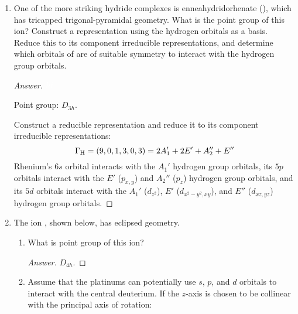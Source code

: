 \documentclass[../psets.tex]{subfiles}
\begin{document}
\begin{enumerate}[label={\Roman*)}]
\begin{enumerate}[label={\textbf{10.\arabic*}}]
\begin{proof}[Answer]
        \end{proof}
        \newpage
        \setcounter{enumii}{29}
        \item One of the more striking hydride complexes is enneahydridorhenate (), which has tricapped trigonal-pyramidal geometry. What is the point group of this ion? Construct a representation using the hydrogen orbitals as a basis. Reduce this to its component irreducible representations, and determine which orbitals of  are of suitable symmetry to interact with the hydrogen group orbitals.
        \begin{proof}[Answer]
            ${\color{white}hi}$
            \begin{center}
                \chemleft{[}
                \chemright{]^{2-}}
            \end{center}
            Point group: $D_{3h}$.\par
            Construct a reducible representation and reduce it to its component irreducible representations:
            \begin{equation*}
                \Gamma_{\ce{H}} = (9,0,1,3,0,3) = 2A_1'+2E'+A_2''+E''
            \end{equation*}
            Rhenium's $6s$ orbital interacts with the $A_1'$ hydrogen group orbitals, its $5p$ orbitals interact with the $E'$ ($p_{x,y}$) and $A_2''$ ($p_z$) hydrogen group orbitals, and its $5d$ orbitals interact with the $A_1'$ ($d_{z^2}$), $E'$ ($d_{x^2-y^2,xy}$), and $E''$ ($d_{xz,yz}$) hydrogen group orbitals.
        \end{proof}
        \newpage
        \setcounter{enumii}{32}
        \item The ion , shown below, has eclipsed geometry.
        \begin{center}
        \end{center}
        \begin{enumerate}[label={\textbf{\alph*.}}]
            \item What is point group of this ion?
            \begin{proof}[Answer]
                $D_{4h}$.
            \end{proof}
            \item Assume that the platinums can potentially use $s$, $p$, and $d$ orbitals to interact with the central deuterium. If the $z$-axis is chosen to be collinear with the principal axis of rotation:

\end{enumerate}
\end{enumerate}
\end{enumerate}
\end{document}
